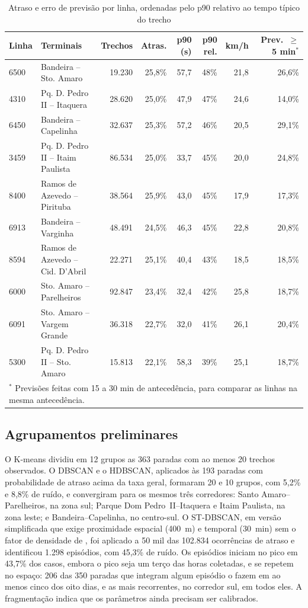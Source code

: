 \begin{table}[ht]
\centering
\caption{Atraso e erro de previsão por linha, ordenadas pelo p90 relativo ao
tempo típico do trecho}
\label{tab:linhas}
\footnotesize
\setlength{\tabcolsep}{3.5pt}
\begin{tabular}{llrrrrrr}
\hline
Linha & Terminais & Trechos & Atras. & p90 (s) & p90 rel. & km/h & Prev.\ $\geq$ 5 min$^*$ \\
\hline
6500 & Bandeira -- Sto. Amaro & 19.230 & 25,8\% & 57,7 & 48\% & 21,8 & 26,6\% \\
4310 & Pq. D. Pedro II -- Itaquera & 28.620 & 25,0\% & 47,9 & 47\% & 24,6 & 14,0\% \\
6450 & Bandeira -- Capelinha & 32.637 & 25,3\% & 57,2 & 46\% & 20,5 & 29,1\% \\
3459 & Pq. D. Pedro II -- Itaim Paulista & 86.534 & 25,0\% & 33,7 & 45\% & 20,0 & 24,8\% \\
8400 & Ramos de Azevedo -- Pirituba & 38.564 & 25,9\% & 43,0 & 45\% & 17,9 & 17,3\% \\
6913 & Bandeira -- Varginha & 48.491 & 24,5\% & 46,3 & 45\% & 22,8 & 20,8\% \\
8594 & Ramos de Azevedo -- Cid. D'Abril & 22.271 & 25,1\% & 40,4 & 43\% & 18,5 & 18,5\% \\
6000 & Sto. Amaro -- Parelheiros & 92.847 & 23,4\% & 32,4 & 42\% & 25,8 & 18,7\% \\
6091 & Sto. Amaro -- Vargem Grande & 36.318 & 22,7\% & 32,0 & 41\% & 26,1 & 20,4\% \\
5300 & Pq. D. Pedro II -- Sto. Amaro & 15.813 & 22,1\% & 58,3 & 39\% & 25,1 & 18,7\% \\
\hline
\multicolumn{8}{l}{\scriptsize $^*$ Previsões feitas com 15 a 30 min de antecedência, para comparar as linhas na mesma antecedência.}
\end{tabular}
\end{table}

\subsection{Agrupamentos preliminares}

O K-means dividiu em 12 grupos as 363 paradas com ao menos 20 trechos
observados. O DBSCAN e o HDBSCAN, aplicados às 193 paradas com probabilidade de
atraso acima da taxa geral, formaram 20 e 10 grupos, com 5,2\% e 8,8\% de ruído,
e convergiram para os mesmos três corredores: Santo Amaro--Parelheiros, na zona
sul; Parque Dom Pedro~II--Itaquera e Itaim Paulista, na zona leste; e
Bandeira--Capelinha, no centro-sul. O ST-DBSCAN, em versão simplificada que
exige proximidade espacial (400~m) e temporal (30~min) sem o fator de densidade
de \cite{birant:2007}, foi aplicado a 50 mil das 102.834 ocorrências de atraso e
identificou 1.298 episódios, com 45,3\% de ruído. Os episódios iniciam no pico em
43,7\% dos casos, embora o pico seja um terço das horas coletadas, e se repetem
no espaço: 206 das 350 paradas que integram algum episódio o fazem em ao menos
cinco dos oito dias, e as mais recorrentes, no corredor sul, em todos eles. A
fragmentação indica que os parâmetros ainda precisam ser calibrados.

